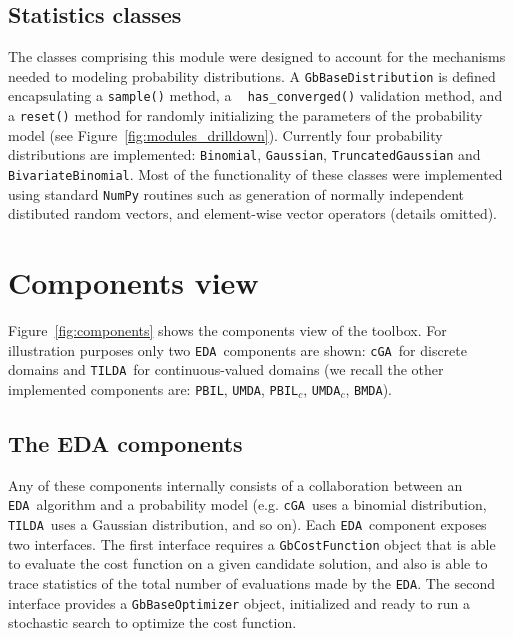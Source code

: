 \documentclass{sig-alternate}
\newcommand{\PBIL}{\texttt{PBIL}}
\newcommand{\UMDA}{\texttt{UMDA}}
\newcommand{\BMDA}{\texttt{BMDA}}
\newcommand{\PBILc}{\texttt{PBIL$_c$}}
\newcommand{\UMDAc}{\texttt{UMDA$_c$}}
\newcommand{\cGA}{\texttt{cGA}}
\newcommand{\EDA}{\texttt{EDA}}
\newcommand{\TILDA}{\texttt{TILDA}}
\newcommand{\figref}[1]{\mbox{Figure \ref{#1}}}
\begin{document}
\subsection{Statistics classes}
The classes comprising this module were designed to account for the mechanisms needed to modeling probability distributions. A \texttt{GbBaseDistri\-bution} is defined encapsulating a \texttt{sample()} method, a \mbox{  }  \texttt{has\_converged()} validation method, and a \texttt{reset()} method for randomly initializing the parameters of the probability model (see \figref{fig:modules_drilldown}). Currently four probability distributions are implemented: \texttt{Bino\-mial}, \texttt{Gaussian}, \texttt{TruncatedGaussian} and \texttt{BivariateBinomi\-al}. Most of the functionality of these classes were implemented using standard \texttt{NumPy} routines such as generation of normally independent distibuted random vectors, and element-wise vector operators (details omitted). 




%        


\section{Components view}
\label{sec:components}
\figref{fig:components} shows the components view of the toolbox. For illustration purposes only two \EDA~components are shown: \cGA~for discrete domains and \TILDA~for continuous-valued domains (we recall the other implemented components are: \PBIL, \UMDA, \PBILc, \UMDAc, \BMDA). 

\subsection{The EDA components}
Any of these components internally consists of a collaboration between an \EDA~algorithm and a probability model (e.g. \cGA~uses a binomial distribution, \TILDA~uses a Gaussian distribution, and so on). Each \EDA~component exposes two interfaces. The first interface requires a \texttt{GbCostFunction} object that is able to evaluate the cost function on a given candidate solution, and also is able to trace statistics of the total number of evaluations made by the \EDA. The second interface provides a \texttt{GbBaseOptimizer} object, initialized and ready to run a stochastic search to optimize the cost function. 
\end{document}
